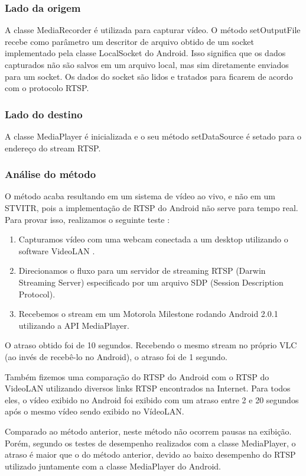 \documentclass{acm_proc_article-sp}
\begin{document}
\subsubsection{Lado da origem}
A classe MediaRecorder é utilizada para capturar vídeo. O método setOutputFile recebe como parâmetro um descritor de arquivo obtido de um socket implementado pela classe LocalSocket do Android. Isso significa que os dados capturados não são salvos em um arquivo local, mas sim diretamente enviados para um socket. Os dados do socket são lidos e tratados para ficarem de acordo com o protocolo RTSP.

\subsubsection{Lado do destino}
A classe MediaPlayer é inicializada e o seu método setDataSource é setado para o endereço do stream RTSP.

\subsubsection{Análise do método}
O método acaba resultando em um sistema de vídeo ao vivo, e não em um STVITR, pois a implementação de RTSP do Android não serve para tempo real. Para provar isso, realizamos o seguinte teste :

\begin{enumerate}
 \item Capturamos vídeo com uma webcam conectada a um desktop utilizando o software VideoLAN .
 \item Direcionamos o fluxo para um servidor de streaming RTSP (Darwin Streaming Server) especificado por um arquivo SDP (Session Description Protocol).
 \item Recebemos o stream em um Motorola Milestone rodando Android 2.0.1 utilizando a API MediaPlayer.
\end{enumerate}

O atraso obtido foi de 10 segundos. Recebendo o mesmo stream no próprio VLC (ao invés de recebê-lo no Android), o atraso foi de 1 segundo.	 	 	

Também fizemos uma comparação do RTSP do Android com o RTSP do VideoLAN utilizando diversos links RTSP encontrados na Internet. Para todos eles, o vídeo exibido no Android foi exibido com um atraso entre 2 e 20 segundos após o mesmo vídeo sendo exibido no VídeoLAN.

Comparado ao método anterior, neste método não ocorrem pausas na exibição. Porém, segundo os testes de desempenho realizados com a classe MediaPlayer, o atraso é maior que o do método anterior, devido ao baixo desempenho do RTSP utilizado juntamente com a classe MediaPlayer do Android.
\end{document}
